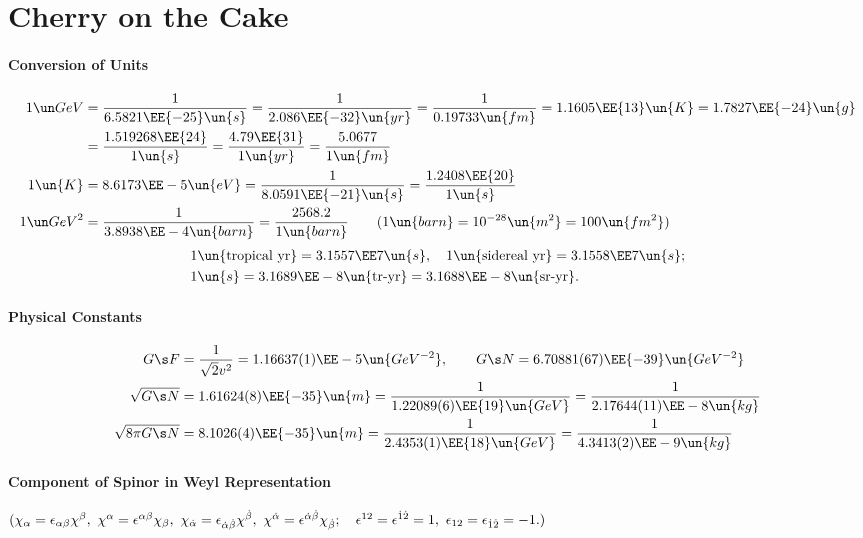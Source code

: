 
\section{Cherry on the Cake}
\paragraph{Conversion of Units}
\begin{align}
 1\GeV &= \frac1{6.5821\EE{-25}\un{s}} = \frac1{2.086\EE{-32}\un{yr}}
        = \frac1{0.19733\un{fm}}  = 1.1605\EE{13}\un{K} = 1.7827\EE{-24}\un{g}\notag\\
       &= \frac{1.519268\EE{24}}{1\un{s}} = \frac{4.79\EE{31}}{1\un{yr}}
        = \frac{5.0677}{1\un{fm}}\\
1\un{K}&= 8.6173\EE-5\un{eV} = \frac1{8.0591\EE{-21}\un{s}} = \frac{1.2408\EE{20}}{1\un{s}}\\
1\GeV^2&= \frac1{3.8938\EE-4\un{barn}} = \frac{2568.2}{1\un{barn}}\qquad(1\un{barn}=10^{-28}\un{m^2} = 100\un{fm^2})
\end{align}
\vspace{-2zw}
\begin{equation}\begin{split}
 &1\un{\text{tropical yr}} = 3.1557\EE7\un{s},\quad 1\un{\text{sidereal yr}} = 3.1558\EE7\un{s};\\
 &1\un{s} = 3.1689\EE-8\un{\text{tr-yr}} = 3.1688\EE-8\un{\text{sr-yr}}.
\end{split}\end{equation}
\paragraph{Physical Constants}
\begin{align}
 G\s F &= \frac{1}{\sqrt2v^2} = 1.16637(1)\EE-5\un{GeV^{-2}},\qquad
 G\s N = 6.70881(67)\EE{-39}\un{GeV^{-2}}\\
 \sqrt{G\s N} &= 1.61624(8)\EE{-35}\un{m} = \frac1{1.22089(6)\EE{19}\un{GeV}}
               = \frac1{2.17644(11)\EE-8\un{kg}}\\
 \sqrt{8\pi G\s N}&= 8.1026(4)\EE{-35}\un{m} = \frac1{2.4353(1)\EE{18}\un{GeV}}
                   = \frac1{4.3413(2)\EE-9\un{kg}}
\end{align}
\paragraph{Component of Spinor in Weyl Representation}\mbox{}\par
$(\chi_\alpha=\epsilon_{\alpha\beta}\chi^\beta,\
  \chi^\alpha=\epsilon^{\alpha\beta}\chi_\beta,\
  \chi_{\dot\alpha}=\epsilon_{{\dot\alpha}{\dot\beta}}\chi^{\dot\beta},\
  \chi^{\dot\alpha}=\epsilon^{{\dot\alpha}{\dot\beta}}\chi_{\dot\beta};\quad
  \epsilon^{12}=\epsilon^{\dot1\dot2}=1, \
  \epsilon_{12}=\epsilon_{\dot1\dot2}=-1.)$

